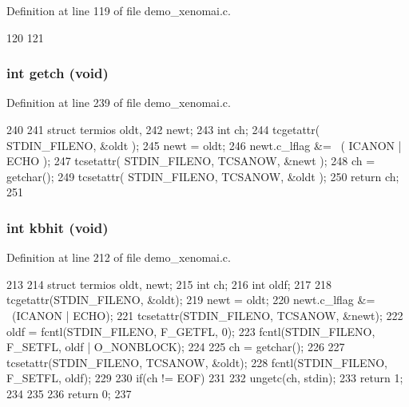 Definition at line 119 of file demo\_\-xenomai.c.


\begin{DoxyCode}
120 {
121 }
\end{DoxyCode}
\subsubsection[{getch}]{\setlength{\rightskip}{0pt plus 5cm}int getch (void)}\label{demo__xenomai_8c_af5978fab9fa6dd4ced1c3a8ab1251f7b}


Definition at line 239 of file demo\_\-xenomai.c.


\begin{DoxyCode}
240 {
241         struct termios oldt,
242         newt;
243         int ch;
244         tcgetattr( STDIN_FILENO, &oldt );
245         newt = oldt;
246         newt.c_lflag &= ~( ICANON | ECHO );
247         tcsetattr( STDIN_FILENO, TCSANOW, &newt );
248         ch = getchar();
249         tcsetattr( STDIN_FILENO, TCSANOW, &oldt );
250         return ch;
251 }
\end{DoxyCode}
\subsubsection[{kbhit}]{\setlength{\rightskip}{0pt plus 5cm}int kbhit (void)}\label{demo__xenomai_8c_a97e9b1fe8d4c010474637a654aad6566}


Definition at line 212 of file demo\_\-xenomai.c.


\begin{DoxyCode}
213 {
214         struct termios oldt, newt;
215         int ch;
216         int oldf;
217 
218         tcgetattr(STDIN_FILENO, &oldt);
219         newt = oldt;
220         newt.c_lflag &= ~(ICANON | ECHO);
221         tcsetattr(STDIN_FILENO, TCSANOW, &newt);
222         oldf = fcntl(STDIN_FILENO, F_GETFL, 0);
223         fcntl(STDIN_FILENO, F_SETFL, oldf | O_NONBLOCK);
224 
225         ch = getchar();
226 
227         tcsetattr(STDIN_FILENO, TCSANOW, &oldt);
228         fcntl(STDIN_FILENO, F_SETFL, oldf);
229 
230         if(ch != EOF)
231         {
232         ungetc(ch, stdin);
233         return 1;
234         }
235 
236         return 0;
237 }
\end{DoxyCode}
